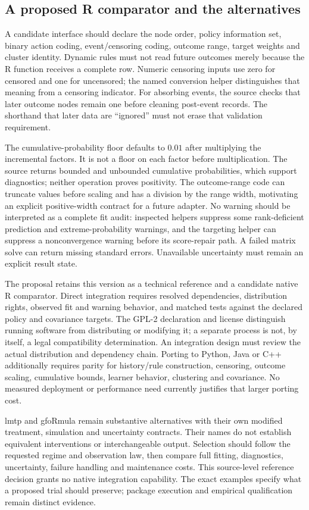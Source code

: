 \subsection{A proposed R comparator and the alternatives}

A candidate interface should declare the node order, policy information set,
binary action coding, event/censoring coding, outcome range, target weights
and cluster identity. Dynamic rules must not read future outcomes merely
because the R function receives a complete row. Numeric censoring inputs
use zero for censored and one for uncensored; the named conversion helper
distinguishes that meaning from a censoring indicator. For absorbing events,
the source checks that later outcome nodes remain one before cleaning
post-event records. The shorthand that later data are ``ignored'' must not
erase that validation requirement.\citep{exec23_ltmle_source}

The cumulative-probability floor defaults to $0.01$ after multiplying the
incremental factors. It is not a floor on each factor before multiplication.
The source returns bounded and unbounded cumulative probabilities, which
support diagnostics; neither operation proves positivity. The outcome-range
code can truncate values before scaling and has a division by the range
width, motivating an explicit positive-width contract for a future adapter.
No warning should be interpreted as a complete fit audit: inspected helpers
suppress some rank-deficient prediction and extreme-probability warnings,
and the targeting helper can suppress a nonconvergence warning before its
score-repair path. A failed matrix solve can return missing standard errors.
Unavailable uncertainty must remain an explicit result state.
\citep{exec23_ltmle_source}

The proposal retains this version as a technical reference and a candidate
native R comparator. Direct integration requires resolved dependencies,
distribution rights, observed fit and warning behavior, and matched tests
against the declared policy and covariance targets. The GPL-2 declaration
and license distinguish running software from distributing or modifying it;
a separate process is not, by itself, a legal compatibility determination.
An integration design must review the actual distribution and dependency
chain. Porting to Python, Java or C++ additionally requires parity for
history/rule construction, censoring, outcome scaling, cumulative bounds,
learner behavior, clustering and covariance. No measured deployment or
performance need currently justifies that larger porting cost.
\citep{exec23_ltmle_source}

lmtp and gfoRmula remain substantive alternatives with their own modified
treatment, simulation and uncertainty contracts. Their names do not establish
equivalent interventions or interchangeable output. Selection should follow
the requested regime and observation law, then compare full fitting,
diagnostics, uncertainty, failure handling and maintenance costs. This
source-level reference decision grants no native integration capability.
The exact examples specify what a proposed trial should preserve; package
execution and empirical qualification remain distinct evidence.

